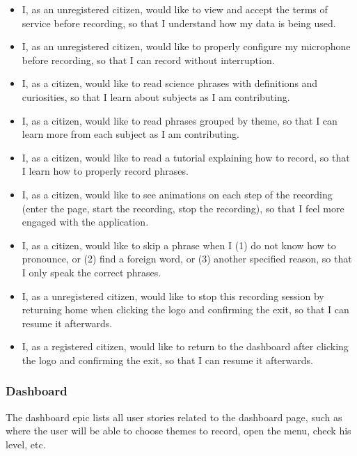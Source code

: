 \begin{itemize}
    \item I, as an unregistered citizen, would like to view and accept the terms of service before recording, so that I understand how my data is being used.
    \item I, as an unregistered citizen, would like to properly configure my microphone before recording, so that I can record without interruption.
    \item I, as a citizen, would like to read science phrases with definitions and curiosities, so that I learn about subjects as I am contributing.
    \item I, as a citizen, would like to read phrases grouped by theme, so that I can learn more from each subject as I am contributing.
    \item I, as a citizen, would like to read a tutorial explaining how to record, so that I learn how to properly record phrases.
    \item I, as a citizen, would like to see animations on each step of the recording (enter the page, start the recording, stop the recording), so that I feel more engaged with the application.
    \item I, as a citizen, would like to skip a phrase when I (1) do not know how to pronounce, or (2) find a foreign word, or (3) another specified reason, so that I only speak the correct phrases.
    \item I, as a unregistered citizen, would like to stop this recording session by returning home when clicking the logo and confirming the exit, so that I can resume it afterwards.
    \item I, as a registered citizen, would like to return to the dashboard after clicking the logo and confirming the exit, so that I can resume it afterwards.
\end{itemize}

\subsubsection{Dashboard}

The dashboard epic lists all user stories related to the dashboard page, such as where the user will be able to choose themes to record, open the menu, check his level, etc.

